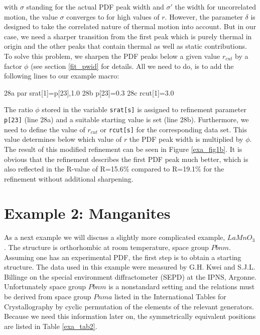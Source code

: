 \noindent with $\sigma$ standing for the actual PDF peak width and
$\sigma'$ the width for uncorrelated motion, the value $\sigma$
converges to for high values of $r$. However, the parameter
$\delta$ is designed to take the correlated nature of thermal
motion into account. But in our case, we need a sharper transition
from the first peak which is purely thermal in origin and the
other peaks that contain thermal as well as static contributions.
To solve this problem, we sharpen the PDF peaks below a given
value $r_{cut}$ by a factor $\phi$ (see section \ref{fit_pwid} for
details. All we need to do, is to add the following lines to our
example macro:

\footnotesize
\begin{MacVerbatim}
     28a  par srat[1]=p[23],1.0
     28b  p[23]=0.3
     28c  rcut[1]=3.0
\end{MacVerbatim}
\normalsize

\noindent The ratio $\phi$ stored in the variable {\tt srat[s]} is
assigned to refinement parameter {\tt p[23]} (line 28a) and a
suitable starting value is set (line 28b). Furthermore, we need to
define the value of $r_{cut}$ or {\tt rcut[s]} for the
corresponding data set. This value determines below which value of
$r$ the PDF peak width is multiplied by $\phi$. The result of this
modified refinement can be seen in Figure \ref{exa_fig1b}. It is
obvious that the refinement describes the first PDF peak much
better, which is also reflected in the R-value of R=15.6\%
compared to R=19.1\% for the refinement without additional
sharpening.


\section{Example 2: Manganites\label{exa_mang}}

As a next example we will discuss a slightly more complicated
example, $LaMnO_{3}$. The structure is orthorhombic at room
temperature, space group $Pbnm$. Assuming one has an experimental
PDF, the first step is to obtain a starting structure. The data
used in this example were measured by G.H. Kwei and S.J.L.
Billinge on the special environment diffractometer (SEPD) at the
IPNS, Argonne. Unfortunately space group $Pbnm$ is a nonstandard
setting and the relations must be derived from space group $Pnma$
listed in the International Tables for Crystallography
\cite{tables} by cyclic permutation of the elements of the
relevant generators. Because we need this information later on,
the symmetrically equivalent positions are listed in Table
\ref{exa_tab2}.


